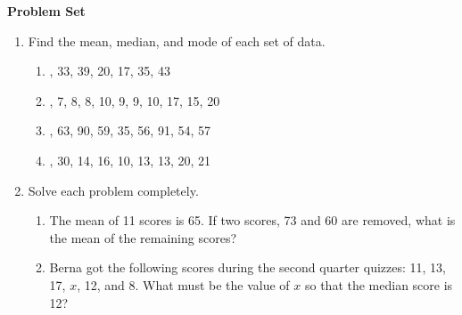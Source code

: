 \textbf{Problem Set}

\vspce

\begin{enumerate}[label = \Alph*. ]
\item \hspce Find the mean, median, and mode  of each set of data.
\begin{enumerate}[label = \arabic*. ]
\item {}, 33, 39, 20, 17, 35, 43
\item {}, 7, 8, 8, 10, 9, 9, 10, 17, 15, 20
\item {}, 63, 90, 59, 35, 56, 91, 54, 57
\item {}, 30, 14, 16, 10, 13, 13, 20, 21

\end{enumerate}  

\item \hspce Solve each problem completely. 
\begin{enumerate}[label = \arabic*. ]
\item The mean of 11 scores is 65. If two scores, 73 and 60 are removed, what is the mean of the remaining scores?
\item Berna got the following scores during the second  quarter quizzes: 11, 13, 17, $x$, 12, and 8. What must be the value of $x$ so that the median score is 12?

\end{enumerate}   

\end{enumerate} 